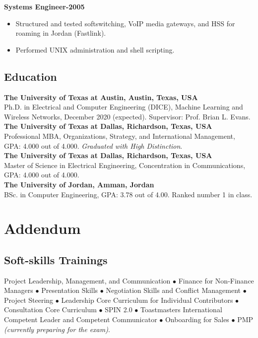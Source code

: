 \documentclass{article}
\renewcommand{\headrulewidth}{0pt}
\begin{document}
\textbf{Systems Engineer\hfill{}-2005}
\begin{itemize}
\item Structured and tested softswitching, VoIP media gateways, and HSS for roaming in Jordan (Fastlink). 
\item Performed UNIX administration and shell scripting. 
\end{itemize}
\begin{center}
\subsection*{\sc Education}
\textbf{The University of Texas at Austin, Austin, Texas, USA} \\
Ph.D. in Electrical and Computer Engineering (DICE), Machine Learning and Wireless Networks, December 2020 (expected).  Supervisor: Prof. Brian L. Evans. \\
\vspace*{0.1in}
\textbf{The University of Texas at Dallas, Richardson, Texas, USA} \\
Professional MBA, Organizations, Strategy, and International Management, GPA: 4.000 out of 4.000. \textit{Graduated with High Distinction}.\\
\vspace*{0.1in}
\textbf{The University of Texas at Dallas, Richardson, Texas, USA} \\
Master of Science in Electrical Engineering, Concentration in Communications, GPA: 4.000 out of 4.000. \\
\vspace*{0.1in}
\textbf{The University of Jordan, Amman, Jordan} \\
BSc. in Computer Engineering, GPA: 3.78 out of 4.00.  Ranked number 1 in class.
\end{center}
\newpage
\fancyhf{}
\renewcommand{\headrulewidth}{0pt}
\setcounter{page}{1}
\section*{\centering \sc \textbf{Addendum}}
\subsection*{\sc Soft-skills Trainings}
Project Leadership, Management, and Communication $\bullet$
Finance for Non-Finance Managers $\bullet$ Presentation Skills $\bullet$ Negotiation Skills and Conflict Management $\bullet$ Project Steering $\bullet$ Leadership Core Curriculum for Individual Contributors $\bullet$ Consultation Core Curriculum $\bullet$ SPIN 2.0 $\bullet$ Toastmasters International Competent Leader and Competent Communicator $\bullet$ Onboarding for Sales $\bullet$ PMP {\textregistered} \textit{(currently preparing for the exam)}.
\vspace*{-0.1in}
\end{document}
